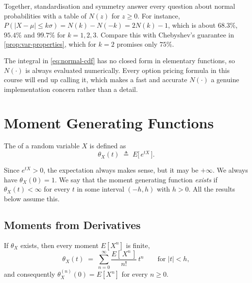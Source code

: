 Together, standardisation and symmetry answer every question about normal probabilities with a table of $N(z)$ for $z\ge0$.
For instance, $P(|X-\mu|\le k\sigma)=N(k)-N(-k)=2N(k)-1$, which is about $68.3\%$, $95.4\%$ and $99.7\%$ for $k=1,2,3$.
Compare this with Chebyshev's guarantee in \autoref{prop:var-properties}, which for $k=2$ promises only $75\%$.

\begin{note}
	The integral in \eqref{eq:normal-cdf} has no closed form in elementary functions, so $N(\cdot)$ is always evaluated numerically.
	Every option pricing formula in this course will end up calling it, which makes a fast and accurate $N(\cdot)$ a genuine implementation concern rather than a detail.
\end{note}
\suppend

\section{Moment Generating Functions}
\label{sec:mgf}


\begin{definition}
	The  of a random variable $X$ is defined as
	\[
		\theta_{X}(t) \;\triangleq\; E\bigl[\,e^{tX}\,\bigr] .
	\]
\end{definition}

\suppstart
Since $e^{tX}>0$, the expectation always makes sense, but it may be $+\infty$.
We always have $\theta_{X}(0)=1$.
We say that the moment generating function \emph{exists} if $\theta_{X}(t)<\infty$ for every $t$ in some interval $(-h,h)$ with $h>0$.
All the results below assume this.

\subsection{Moments from Derivatives}

\begin{proposition}\label{prop:mgf-moments}
	If $\theta_{X}$ exists, then every moment $E[X^{n}]$ is finite,
	\begin{equation}
		\theta_{X}(t) \;=\; \sum_{n=0}^{\infty}\frac{E[\,X^{n}\,]}{n!}\,t^{n}
		\qquad\text{for } |t|<h , \label{eq:mgf-series}
	\end{equation}
	and consequently $\theta_{X}^{(n)}(0)=E[X^{n}]$ for every $n\ge0$.
\end{proposition}

